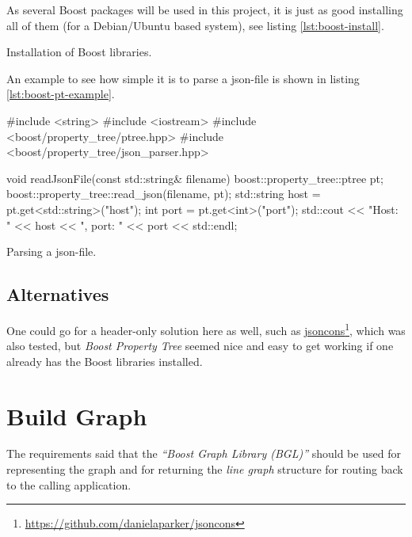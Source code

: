 \documentclass[../main.tex]{subfiles}
\begin{document}
As several Boost packages will be used in this project, it is just as good installing all of them (for a Debian/Ubuntu based system), see listing \ref{lst:boost-install}.

\begin{mylisting}
\caption{Installation of Boost libraries.}
\label{lst:boost-install}
\end{mylisting}

An example to see how simple it is to parse a json-file is shown in listing \ref{lst:boost-pt-example}.

\begin{mylisting}
\begin{cppcode}
#include <string>
#include <iostream>
#include <boost/property_tree/ptree.hpp>
#include <boost/property_tree/json_parser.hpp>

void readJsonFile(const std::string& filename) {
	boost::property_tree::ptree pt;
	boost::property_tree::read_json(filename, pt);
	std::string host = pt.get<std::string>("host");
	int port = pt.get<int>("port");
	std::cout << "Host: " << host << ", port: " << port << std::endl;
}
\end{cppcode}
\caption{Parsing a json-file.}
\label{lst:boost-pt-example}
\end{mylisting}


\subsection{Alternatives}
One could go for a header-only solution here as well, such as \href{https://github.com/danielaparker/jsoncons}{jsoncons}\footnote{\url{https://github.com/danielaparker/jsoncons}}, which was also tested, but \emph{Boost Property Tree} seemed nice and easy to get working if one already has the Boost libraries installed.


\section{Build Graph}
The requirements said that the \textit{``Boost Graph Library (BGL)''} should be used for representing the graph and for returning the \textit{line graph} structure for routing back to the calling application.
\end{document}
